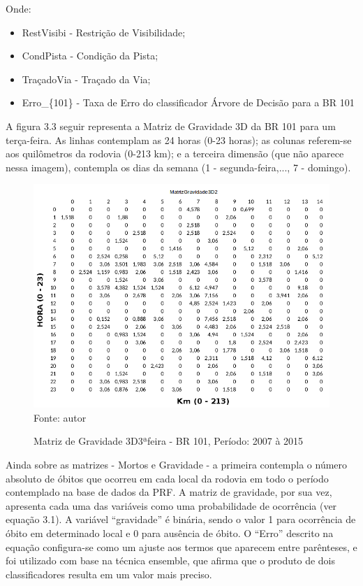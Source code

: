 Onde:

\begin{itemize}
	\item RestVisibi - Restrição de Visibilidade;
	\item CondPista  - Condição da Pista;
	\item TraçadoVia - Traçado da Via;
	\item Erro\_\{101\} - Taxa de Erro do classificador Árvore de Decisão para a BR 101
\end{itemize}
 
 \pagebreak
 
 A figura 3.3 seguir representa a Matriz de Gravidade 3D da BR 101 para um terça-feira. As linhas contemplam as 24 horas (0-23 horas); as colunas referem-se aos quilômetros da rodovia (0-213 km); e a terceira dimensão (que não aparece nessa imagem),  contempla os dias da semana (1 - segunda-feira,..., 7 - domingo). 
 
 
 \begin{figure}[!ht]
 	\centering
 	\caption{Matriz de Gravidade 3D3ªfeira - BR 101, Período: 2007 à 2015}
 	\label{fig:MatrizGravidade3D2}
 	\includegraphics[width=0.7\linewidth]{Figuras/Metodologia/MatrizGravidade3D2.png}\\
 	\tiny Fonte: autor
 \end{figure}



Ainda sobre as matrizes - Mortos e Gravidade - a primeira contempla o número absoluto de óbitos que ocorreu em cada local da rodovia em todo o período contemplado na base de dados da PRF. A matriz de gravidade, por sua vez, apresenta cada uma das variáveis como uma probabilidade de ocorrência (ver equação 3.1). A variável ``gravidade'' é binária, sendo o valor 1 para ocorrência de óbito em determinado local e 0 para ausência de óbito. O ``Erro'' descrito na equação configura-se como um ajuste aos termos que aparecem entre parênteses, e foi utilizado com base na técnica ensemble, que afirma que o produto de dois classificadores resulta em um valor mais preciso.    

